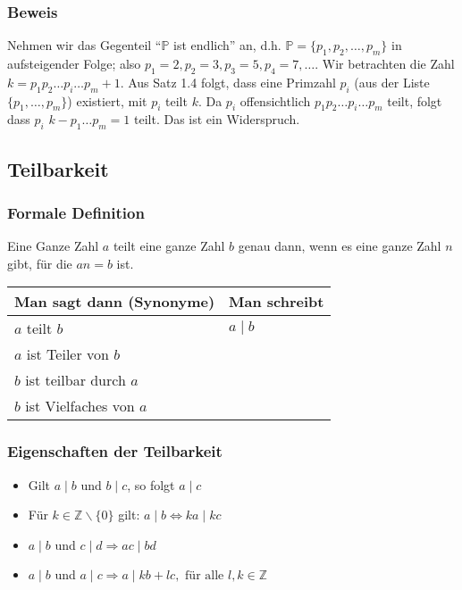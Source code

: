 \subsubsection*{Beweis}
Nehmen wir das Gegenteil ``$\mathbb{P}$ ist endlich'' an, d.h. $\mathbb{P}=\{p_1,p_2,\dots,p_m\}$ in aufsteigender Folge; also $p_1=2,p_2=3,p_3=5,p_4=7,\dots$. Wir betrachten die Zahl $k=p_1 p_2\dots p_i \dots p_m+1$. Aus Satz 1.4 folgt, dass eine Primzahl $p_i$ (aus der Liste $\{p_1 ,\dots , p_{m}\}$) existiert, mit $p_i$ teilt $k$. Da $p_i$ offensichtlich $p_1 p_2\dots p_i \dots p_m$ teilt, folgt dass $p_i$ $k-p_1\dots p_{m}=1$ teilt. Das ist ein Widerspruch. 

\subsection*{Teilbarkeit}
\subsubsection{Formale Definition}
Eine Ganze Zahl $a$ teilt eine ganze Zahl $b$ genau dann, wenn es eine ganze Zahl $n$ gibt, für die $an=b$ ist. \\
\begin{center}
\begin{tabular}{l|l}
Man sagt dann (Synonyme) & Man schreibt \\\hline 
$a$ teilt $b$ & $a\mid b$\\
$a$ ist Teiler von $b$ & ~\\
$b$ ist teilbar durch $a$ & ~\\
$b$ ist Vielfaches von $a$ & ~\\
\end{tabular}
\end{center}

\subsubsection*{Eigenschaften der Teilbarkeit}
\begin{itemize}
\item Gilt $a\mid b$ und $b\mid c$, so folgt $a\mid c$
\item Für $k\in\mathbb{Z}\backslash\{0\}$ gilt: $a\mid b\Longleftrightarrow ka\mid kc$ 
\item $a\mid b$ und $c\mid d\Rightarrow ac\mid bd$
\item $a\mid b$ und $a\mid c\Rightarrow a\mid kb+lc,\text{    für alle }l,k\in\mathbb{Z}$
\end{itemize}

